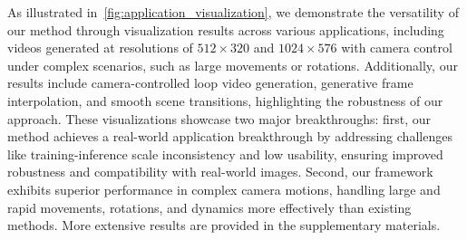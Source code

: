



As illustrated in~\cref{fig:application_visualization}, we demonstrate the versatility of our method through visualization results across various applications, including videos generated at resolutions of \(512 \times 320\) and \(1024 \times 576\) with camera control under complex scenarios, such as large movements or rotations. 
Additionally, our results include camera-controlled loop video generation, generative frame interpolation, and smooth scene transitions, highlighting the robustness of our approach. 
These visualizations showcase two major breakthroughs: first, our method achieves a real-world application breakthrough by addressing challenges like training-inference scale inconsistency and low usability, ensuring improved robustness and compatibility with real-world images. 
Second, our framework exhibits superior performance in complex camera motions, handling large and rapid movements, rotations, and dynamics more effectively than existing methods. 
More extensive results are provided in the supplementary materials.





